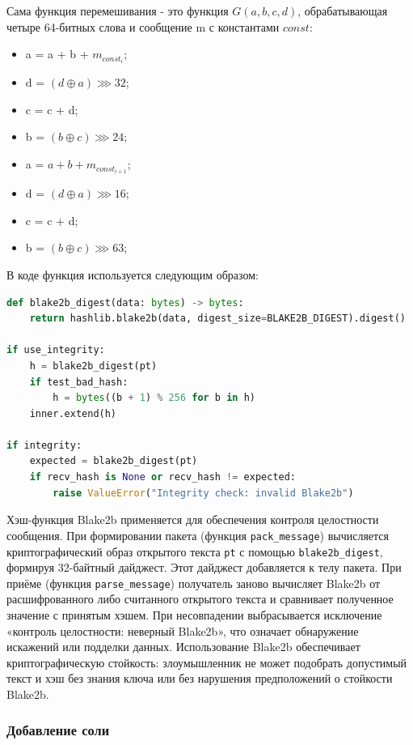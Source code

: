 \documentclass[areasetadvanced]{scrartcl}
\begin{document}
Сама функция перемешивания - это функция $G(a,b,c,d)$, обрабатывающая четыре 64-битных слова 
и сообщение m с константами $const$: 

\begin{itemize}
    \item a = a + b + $m_{const_i}$;
    \item d = $(d \oplus a) \ggg 32$;
    \item c = c + d;
    \item b = $(b \oplus c) \ggg 24$;
    \item a = $a+b+m_{const_{i+1}}$;
    \item d = $(d \oplus a) \ggg 16$;
    \item c = c + d;
    \item b = $(b \oplus c) \ggg 63$;
\end{itemize}

В коде функция используется следующим образом:
\begin{lstlisting}[language=Python]
def blake2b_digest(data: bytes) -> bytes:
    return hashlib.blake2b(data, digest_size=BLAKE2B_DIGEST).digest()

if use_integrity:
    h = blake2b_digest(pt)
    if test_bad_hash:
        h = bytes((b + 1) % 256 for b in h)
    inner.extend(h)

if integrity:
    expected = blake2b_digest(pt)
    if recv_hash is None or recv_hash != expected:
        raise ValueError("Integrity check: invalid Blake2b")
\end{lstlisting}

Хэш-функция Blake2b применяется для обеспечения контроля целостности сообщения. При формировании пакета (функция \texttt{pack\_message}) вычисляется криптографический образ открытого текста \texttt{pt} с помощью \texttt{blake2b\_digest}, формируя 32-байтный дайджест. Этот дайджест добавляется к телу пакета. При приёме (функция \texttt{parse\_message}) получатель заново вычисляет Blake2b от расшифрованного либо считанного открытого текста и сравнивает полученное значение с принятым хэшем. При несовпадении выбрасывается исключение «контроль целостности: неверный Blake2b», что означает обнаружение искажений или подделки данных. Использование Blake2b обеспечивает криптографическую стойкость: злоумышленник не может подобрать допустимый текст и хэш без знания ключа или без нарушения предположений о стойкости Blake2b.

\subsubsection{Добавление соли}
\end{document}
